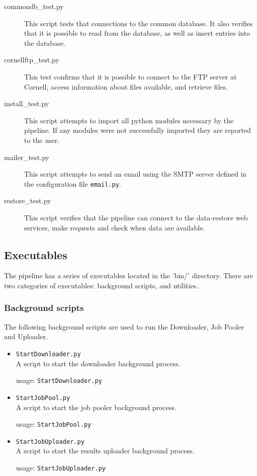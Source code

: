 \documentclass[12pt]{article}
\begin{document}
\begin{description}
    \item[commondb\_test.py] This script tests that connections to the common database. It also verifies that it is possible to read from the database, as well as insert entries into the database.

    \item[cornellftp\_test.py] This test confirms that it is possible to connect to the FTP server at Cornell, access information about files available, and retrieve files.

    \item[install\_test.py] This script attempts to import all python modules necessary by the pipeline. If any modules were not successfully imported they are reported to the user.

    \item[mailer\_test.py] This script attempts to send an email using the SMTP server defined in the configuration file \texttt{email.py}.

    \item[restore\_test.py] This script verifies that the pipeline can connect to the data-restore web services, make requests and check when data are available.
\end{description}

\subsection{Executables}
The pipeline has a series of executables located in the 'bin/' directory. There are two categories of executables: background scripts, and utilities.

\subsubsection{Background scripts}
The following background scripts are used to run the Downloader, Job Pooler and Uploader.
\begin{itemize}
    \item \texttt{StartDownloader.py} \hfill \\
        A script to start the downloader background process.

        usage: \texttt{StartDownloader.py}

    \item \texttt{StartJobPool.py} \hfill \\
        A script to start the job pooler background process.

        usage: \texttt{StartJobPool.py}

    \item \texttt{StartJobUploader.py} \hfill \\
        A script to start the results uploader background process.

        usage: \texttt{StartJobUploader.py}
\end{itemize}
\end{document}
